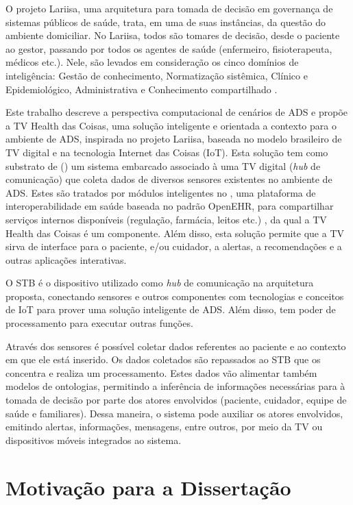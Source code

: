 O projeto Lariisa, uma arquitetura para tomada de decisão em governança
de sistemas públicos de saúde, trata, em uma de suas instâncias, da questão do
ambiente domiciliar. No Lariisa, todos são tomares de decisão, desde o paciente
ao gestor, passando por todos os agentes de saúde (enfermeiro, fisioterapeuta,
médicos etc.). Nele, são levados em consideração os cinco domínios de inteligência:
Gestão de conhecimento, Normatização sistêmica, Clínico e Epidemiológico,
Administrativa e Conhecimento compartilhado \cite{oliveira2010context}.

Este trabalho descreve a perspectiva computacional de cenários de ADS e propõe a TV
Health das Coisas, uma solução inteligente e orientada a contexto para o
ambiente de ADS, inspirada no projeto Lariisa, baseada no modelo brasileiro de
TV digital e na tecnologia Internet das Coisas (IoT). Esta solução tem como
substrato de \hardware[] (\stb) um sistema embarcado associado à uma TV digital
(\textit{hub} de comunicação) que coleta dados de diversos sensores existentes
no ambiente de ADS. Estes são tratados por módulos inteligentes no
\nextsaude[], uma plataforma de interoperabilidade em saúde baseada no padrão
OpenEHR, para compartilhar serviços internos disponíveis (regulação, farmácia,
leitos etc.) \cite{mota2016}, da qual a TV Health das Coisas é um componente.
Além disso, esta solução permite que a TV sirva de interface para o paciente,
e/ou cuidador, a alertas, a recomendações e a outras aplicações interativas.

O STB é o dispositivo utilizado como \textit{hub} de comunicação na arquitetura
proposta, conectando sensores e outros componentes com tecnologias e conceitos
de IoT para  prover uma solução inteligente de ADS. Além
disso, tem poder de processamento para executar outras funções.

Através dos sensores é possível coletar dados referentes ao paciente e ao
contexto em que ele está inserido. Os dados coletados são repassados ao STB que
os concentra e realiza um processamento. Estes dados vão alimentar também
modelos de ontologias, permitindo a inferência de informações necessárias para
à tomada de decisão por parte dos atores  envolvidos (paciente, cuidador,
equipe de saúde e familiares). Dessa maneira, o sistema pode auxiliar os atores
envolvidos, emitindo alertas, informações, mensagens, entre outros, por meio da
TV ou dispositivos móveis integrados ao sistema. 

\section{Motivação para a Dissertação}\label{sec:motivacao}

